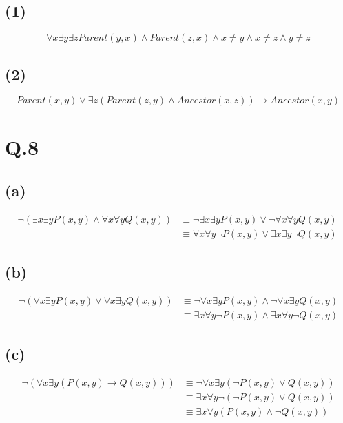 \documentclass[a4paper,12pt]{article}
\begin{document}
\subsection*{(1)}
\begin{equation*}
	\forall x \exists y \exists z Parent(y, x) \wedge Parent(z, x) \wedge x \neq y \wedge x \neq z \wedge y \neq z
\end{equation*}

\subsection*{(2)}
\begin{equation*}
	Parent(x, y) \vee \exists z (Parent(z, y) \wedge Ancestor(x, z)) \to Ancestor(x, y)
\end{equation*}

\section*{Q.8}

\subsection*{(a)}
\begin{align*}
	\neg (\exists x \exists y P(x,y) \wedge \forall x \forall y Q(x,y)) & \equiv \neg \exists x \exists y P(x,y) \vee \neg \forall x \forall y Q(x,y)\\
	& \equiv \forall x \forall y \neg P(x,y) \vee \exists x \exists y \neg Q(x,y)\
\end{align*}

\subsection*{(b)}
\begin{align*}
	\neg (\forall x \exists y P(x,y) \vee \forall x \exists y Q(x,y)) & \equiv \neg \forall x \exists y P(x,y) \wedge \neg \forall x \exists y Q(x,y)\\
	& \equiv \exists x \forall y \neg P(x,y) \wedge \exists x \forall y \neg Q(x,y)
\end{align*}

\subsection*{(c)}
\begin{align*}
	\neg (\forall x \exists y (P(x,y) \to Q(x,y))) & \equiv \neg \forall x \exists y (\neg P(x,y) \vee Q(x,y))\\
	& \equiv \exists x \forall y \neg (\neg P(x,y) \vee Q(x,y))\\
	& \equiv \exists x \forall y (P(x,y) \wedge \neg Q(x,y))
\end{align*}
\end{document}
